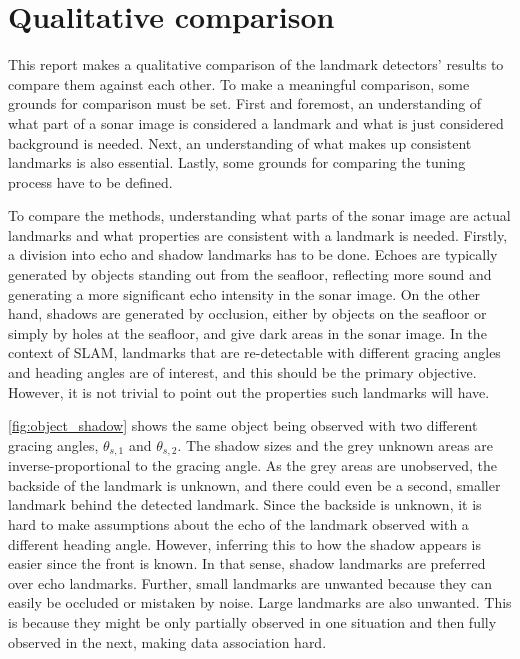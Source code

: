 \section{Qualitative comparison}

This report makes a qualitative comparison of the landmark detectors' results to compare them against each other. To make a meaningful comparison, some grounds for comparison must be set. First and foremost, an understanding of what part of a sonar image is considered a landmark and what is just considered background is needed. Next, an understanding of what makes up consistent landmarks is also essential. Lastly, some grounds for comparing the tuning process have to be defined. 

To compare the methods, understanding what parts of the sonar image are actual landmarks and what properties are consistent with a landmark is needed. Firstly, a division into echo and shadow landmarks has to be done. Echoes are typically generated by objects standing out from the seafloor, reflecting more sound and generating a more significant echo intensity in the sonar image. On the other hand, shadows are generated by occlusion, either by objects on the seafloor or simply by holes at the seafloor, and give dark areas in the sonar image. In the context of SLAM, landmarks that are re-detectable with different gracing angles and heading angles are of interest, and this should be the primary objective. However, it is not trivial to point out the properties such landmarks will have. 

\cref{fig:object_shadow} shows the same object being observed with two different gracing angles, $\theta_{s,1}$ and $\theta_{s,2}$. The shadow sizes and the grey unknown areas are inverse-proportional to the gracing angle. As the grey areas are unobserved, the backside of the landmark is unknown, and there could even be a second, smaller landmark behind the detected landmark. Since the backside is unknown, it is hard to make assumptions about the echo of the landmark observed with a different heading angle. However, inferring this to how the shadow appears is easier since the front is known. In that sense, shadow landmarks are preferred over echo landmarks. Further, small landmarks are unwanted because they can easily be occluded or mistaken by noise. Large landmarks are also unwanted. This is because they might be only partially observed in one situation and then fully observed in the next, making data association hard. 

